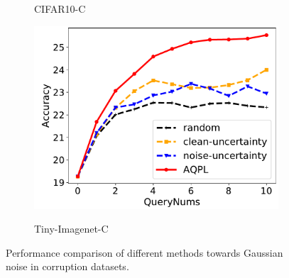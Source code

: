 \documentclass[letterpaper]{article} %
\begin{document}
\begin{figure}[!t]
\begin{subfigure}{0.3\linewidth}
\caption{CIFAR10-C}
\end{subfigure}
\begin{subfigure}{0.3\linewidth}
\centering
\label{fig.TinyImagenet.Gaussian}
\includegraphics[width=1\textwidth]{img/Resnet18-TinyImageNet-GuassianNoise.pdf}\\
\caption{Tiny-Imagenet-C}
\end{subfigure}

\caption{Performance comparison of different methods towards Gaussian noise in corruption datasets.}
\label{fig.comp.Gaussian}
\end{figure}
\end{document}
